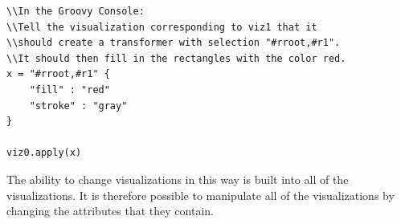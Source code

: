 \begin{verbatim}
\\In the Groovy Console:
\\Tell the visualization corresponding to viz1 that it 
\\should create a transformer with selection "#rroot,#r1". 
\\It should then fill in the rectangles with the color red. 
x = "#rroot,#r1" {
    "fill" : "red"
    "stroke" : "gray"
}

viz0.apply(x)
\end{verbatim}

The ability to change visualizations in this way is built into all of the visualizations. It is therefore possible to manipulate all of the visualizations by changing the attributes that they contain.